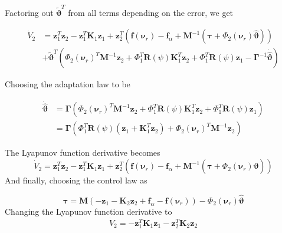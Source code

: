 \documentclass[12pt,a4]{article}
\begin{document}
Factoring out $\bm{\tilde{\vartheta}}^T$ from all terms depending on the error, we get

\begin{align}
	\dot{V}_2 & = \bm{z}_1^T \bm{z}_2 -\bm{z}_1^T\bm{K}_1\bm{z}_1
	+ \bm{z}_2^T \left(	  \bm{f}(\bm{\nu}_r) - \bm{f}_\alpha
	+ \bm{M}^{-1}\left( \bm{\tau} + \Phi_2 (\bm{\nu}_r )\bm{\hat{\vartheta}} \right)\right)                                             \\
	          & +\bm{\tilde{\vartheta}}^T \left(  \Phi_2 (\bm{\nu}_r )^T \bm{M}^{-1} \bm{z}_2 + \Phi_1^T\bm{R}(\psi)\bm{K}_1^T \bm{z}_2
	+ \Phi_1^T\bm{R}(\psi)\bm{z}_1 - \bm{\Gamma}^{-1}\bm{\dot{\hat{\vartheta}}} \right)
\end{align}

Choosing the adaptation law to be

\begin{align}
	\bm{\dot{\hat{\vartheta}}} & = \bm{\Gamma} \left(      \Phi_2 (\bm{\nu}_r )^T \bm{M}^{-1} \bm{z}_2 + \Phi_1^T\bm{R}(\psi)\bm{K}_1^T \bm{z}_2
	+ \Phi_1^T\bm{R}(\psi)\bm{z}_1           \right)                                                                                                                     \\
	                           & = \bm{\Gamma} \left(  \Phi_1^T\bm{R}(\psi) (\bm{z}_1 + \bm{K}_1^T \bm{z}_2)   +    \Phi_2 (\bm{\nu}_r )^T \bm{M}^{-1} \bm{z}_2  \right)
\end{align}

The Lyapunov function derivative becomes
\begin{equation}
	\dot{V}_2 = \bm{z}_1^T \bm{z}_2 -\bm{z}_1^T\bm{K}_1\bm{z}_1	+ \bm{z}_2^T \left(	  \bm{f}(\bm{\nu}_r) - \bm{f}_\alpha
	+ \bm{M}^{-1}\left( \bm{\tau} + \Phi_2 (\bm{\nu}_r )\bm{\hat{\vartheta}} \right)\right)
\end{equation}
And finally, choosing the control law as

\begin{equation}
	\bm{\tau} = \bm{M} \left(
	-\bm{z}_1 - \bm{K}_2 \bm{z}_2 + \bm{f}_\alpha - \bm{f}(\bm{\nu}_r)
	\right)
	- \Phi_2 (\bm{\nu}_r )\bm{\hat{\vartheta}}
\end{equation}
Changing the Lyapunov function derivative to
\begin{equation}
	\dot{V}_2 = -\bm{z}_1^T\bm{K}_1\bm{z}_1	-\bm{z}_2^T\bm{K}_2\bm{z}_2
\end{equation}
\end{document}
